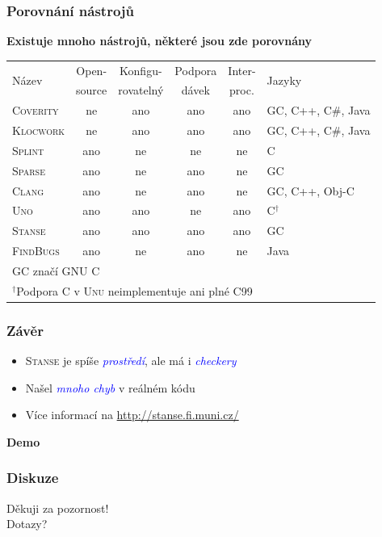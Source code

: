 \documentclass[handout,xcolor=dvipsnames]{beamer}
\let\Oldemph\emph
\renewcommand{\emph}[1]{\textcolor{blue}{\Oldemph{#1}}}
\newcommand{\heading}[1]{\textbf{\textcolor{BurntOrange}{#1}}}
\begin{document}
\begin{frame}
\frametitle{Porovnání nástrojů}
\heading{Existuje mnoho nástrojů, některé jsou zde porovnány}
\small
\begin{tabular}{l|ccccl}
\multirow{2}{*}{Název} &
Open- &
Konfigu- &
Podpora &
Inter- &
\multirow{2}{*}{Jazyky} \\
                  & source & rovatelný & dávek & proc.  & \\ \hline
\textsc{Coverity} & ne   & ano     & ano     & ano    & GC, C++, C\#, Java \\
\textsc{Klocwork} & ne   & ano     & ano     & ano    & GC, C++, C\#, Java \\
\textsc{Splint}   & ano  & ne      & ne      & ne     & C \\
\textsc{Sparse}   & ano  & ne      & ano     & ne     & GC \\
\textsc{Clang}    & ano  & ne      & ano     & ne     & GC, C++, Obj-C \\
\textsc{Uno}      & ano  & ano     & ne      & ano    & C$^\dagger$ \\
\textsc{Stanse}   & ano  & ano     & ano     & ano    & GC \\
\textsc{FindBugs} & ano  & ne      & ano     & ne     & Java \\ \hline
\multicolumn{6}{l}{\footnotesize GC značí GNU C} \\
\multicolumn{6}{l}{\footnotesize $^\dagger$Podpora C v \textsc{Unu}
neimplementuje ani plné C99} \\
\end{tabular}
\end{frame}

\begin{frame}
  \frametitle{Závěr}
  \begin{itemize}
  \item \textsc{Stanse} je spíše \emph{prostředí}, ale má i \emph{checkery}
  \item Našel \emph{mnoho chyb} v reálném kódu
  \item Více informací na \url{http://stanse.fi.muni.cz/}
  \end{itemize}

\end{frame}

\begin{frame}
  \begin{center} \huge
  \heading{Demo}
  \end{center}
\end{frame}

\begin{frame}
  \frametitle{Diskuze}
  \begin{center} \huge
  Děkuji za pozornost! \\[2.4em]
  Dotazy?
  \end{center}
\end{frame}
\end{document}
